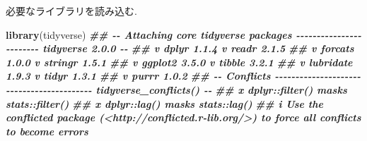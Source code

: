 \documentclass[
]{book}
\newenvironment{Shaded}{\begin{snugshade}}{\end{snugshade}}
\newcommand{\CommentTok}[1]{\textcolor[rgb]{0.56,0.35,0.01}{\textit{#1}}}
\newcommand{\ControlFlowTok}[1]{\textcolor[rgb]{0.13,0.29,0.53}{\textbf{#1}}}
\newcommand{\DocumentationTok}[1]{\textcolor[rgb]{0.56,0.35,0.01}{\textbf{\textit{#1}}}}
\newcommand{\FunctionTok}[1]{\textcolor[rgb]{0.13,0.29,0.53}{\textbf{#1}}}
\newcommand{\NormalTok}[1]{#1}
\newcommand{\OtherTok}[1]{\textcolor[rgb]{0.56,0.35,0.01}{#1}}
\newcommand{\SpecialCharTok}[1]{\textcolor[rgb]{0.81,0.36,0.00}{\textbf{#1}}}
\newcommand{\StringTok}[1]{\textcolor[rgb]{0.31,0.60,0.02}{#1}}
\begin{document}
\begin{Shaded}
\end{Shaded}

必要なライブラリを読み込む.

\begin{Shaded}
\begin{Highlighting}[]
\FunctionTok{library}\NormalTok{(tidyverse)}
\DocumentationTok{\#\# {-}{-} Attaching core tidyverse packages {-}{-}{-}{-}{-}{-}{-}{-}{-}{-}{-}{-}{-}{-}{-}{-}{-}{-}{-}{-}{-}{-}{-}{-} tidyverse 2.0.0 {-}{-}}
\DocumentationTok{\#\# v dplyr     1.1.4     v readr     2.1.5}
\DocumentationTok{\#\# v forcats   1.0.0     v stringr   1.5.1}
\DocumentationTok{\#\# v ggplot2   3.5.0     v tibble    3.2.1}
\DocumentationTok{\#\# v lubridate 1.9.3     v tidyr     1.3.1}
\DocumentationTok{\#\# v purrr     1.0.2     }
\DocumentationTok{\#\# {-}{-} Conflicts {-}{-}{-}{-}{-}{-}{-}{-}{-}{-}{-}{-}{-}{-}{-}{-}{-}{-}{-}{-}{-}{-}{-}{-}{-}{-}{-}{-}{-}{-}{-}{-}{-}{-}{-}{-}{-}{-}{-}{-}{-}{-} tidyverse\_conflicts() {-}{-}}
\DocumentationTok{\#\# x dplyr::filter() masks stats::filter()}
\DocumentationTok{\#\# x dplyr::lag()    masks stats::lag()}
\DocumentationTok{\#\# i Use the conflicted package (\textless{}http://conflicted.r{-}lib.org/\textgreater{}) to force all conflicts to become errors}
\end{Highlighting}
\end{Shaded}
\end{document}
